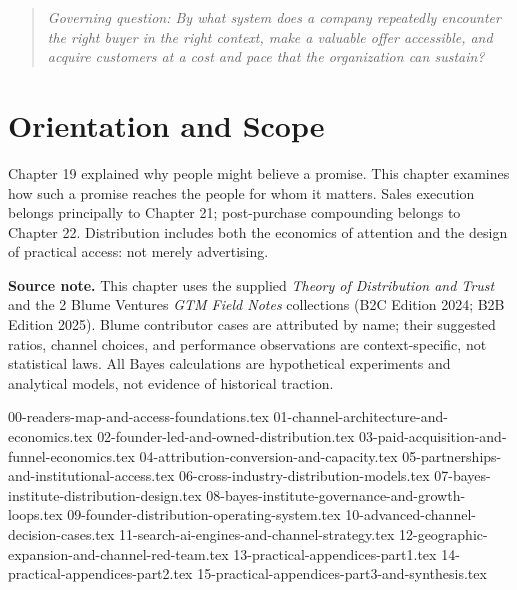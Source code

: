 
\begin{quote}
\textit{Governing question: By what system does a company repeatedly encounter the right buyer in the right context, make a valuable offer accessible, and acquire customers at a cost and pace that the organization can sustain?}
\end{quote}

\vspace{1.5pt}

\section*{Orientation and Scope}

Chapter 19 explained why people might believe a promise. This chapter examines how such a promise reaches the people for whom it matters. Sales execution belongs principally to Chapter 21; post-purchase compounding belongs to Chapter 22. Distribution includes both the economics of attention and the design of practical access: not merely advertising.

\textbf{Source note.} This chapter uses the supplied \textit{Theory of Distribution and Trust} and the 2 Blume Ventures \textit{GTM Field Notes} collections (B2C Edition 2024; B2B Edition 2025). Blume contributor cases are attributed by name; their suggested ratios, channel choices, and performance observations are context-specific, not statistical laws. All Bayes calculations are hypothetical experiments and analytical models, not evidence of historical traction.

{00-readers-map-and-access-foundations.tex}
{01-channel-architecture-and-economics.tex}
{02-founder-led-and-owned-distribution.tex}
{03-paid-acquisition-and-funnel-economics.tex}
{04-attribution-conversion-and-capacity.tex}
{05-partnerships-and-institutional-access.tex}
{06-cross-industry-distribution-models.tex}
{07-bayes-institute-distribution-design.tex}
{08-bayes-institute-governance-and-growth-loops.tex}
{09-founder-distribution-operating-system.tex}
{10-advanced-channel-decision-cases.tex}
{11-search-ai-engines-and-channel-strategy.tex}
{12-geographic-expansion-and-channel-red-team.tex}
{13-practical-appendices-part1.tex}
{14-practical-appendices-part2.tex}
{15-practical-appendices-part3-and-synthesis.tex}

